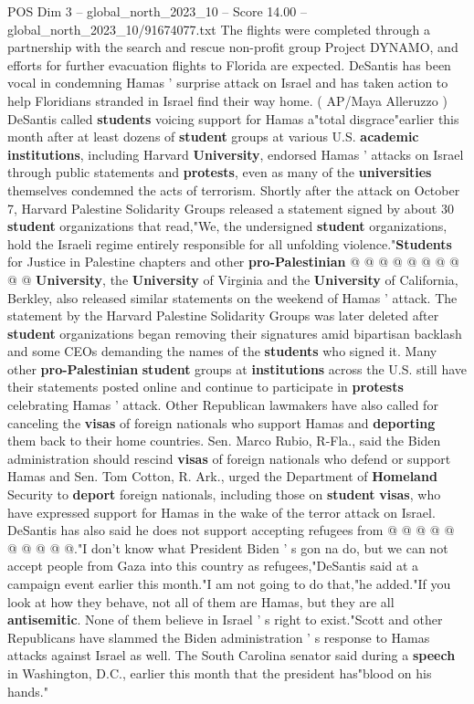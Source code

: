 \begin{textsample}{POS Dim 3 – global\_north\_2023\_10 – Score 14.00 – global\_north\_2023\_10/91674077.txt}
The flights were completed through a partnership with the search and rescue non-profit group Project DYNAMO, and efforts for further evacuation flights to Florida are expected.
DeSantis has been vocal in condemning Hamas ' surprise attack on Israel and has taken action to help Floridians stranded in Israel find their way home. ( AP/Maya Alleruzzo ) DeSantis called \textbf{students} voicing support for Hamas a"total disgrace"earlier this month after at least dozens of \textbf{student} groups at various U.S. \textbf{academic} \textbf{institutions}, including Harvard \textbf{University}, endorsed Hamas ' attacks on Israel through public statements and \textbf{protests}, even as many of the \textbf{universities} themselves condemned the acts of terrorism.
Shortly after the attack on October 7, Harvard Palestine Solidarity Groups released a statement signed by about 30 \textbf{student} organizations that read,"We, the undersigned \textbf{student} organizations, hold the Israeli regime entirely responsible for all unfolding violence."\textbf{Students} for Justice in Palestine chapters and other \textbf{pro-Palestinian} @ @ @ @ @ @ @ @ @ @ \textbf{University}, the \textbf{University} of Virginia and the \textbf{University} of California, Berkley, also released similar statements on the weekend of Hamas ' attack.
The statement by the Harvard Palestine Solidarity Groups was later deleted after \textbf{student} organizations began removing their signatures amid bipartisan backlash and some CEOs demanding the names of the \textbf{students} who signed it.
Many other \textbf{pro-Palestinian} \textbf{student} groups at \textbf{institutions} across the U.S. still have their statements posted online and continue to participate in \textbf{protests} celebrating Hamas ' attack.
Other Republican lawmakers have also called for canceling the \textbf{visas} of foreign nationals who support Hamas and \textbf{deporting} them back to their home countries.
Sen.
Marco Rubio, R-Fla., said the Biden administration should rescind \textbf{visas} of foreign nationals who defend or support Hamas and Sen.
Tom Cotton, R.
Ark., urged the Department of \textbf{Homeland} Security to \textbf{deport} foreign nationals, including those on \textbf{student} \textbf{visas}, who have expressed support for Hamas in the wake of the terror attack on Israel.
DeSantis has also said he does not support accepting refugees from @ @ @ @ @ @ @ @ @ @."I don't know what President Biden ' s gon na do, but we can not accept people from Gaza into this country as refugees,"DeSantis said at a campaign event earlier this month."I am not going to do that,"he added."If you look at how they behave, not all of them are Hamas, but they are all \textbf{antisemitic}.
None of them believe in Israel ' s right to exist."Scott and other Republicans have slammed the Biden administration ' s response to Hamas attacks against Israel as well.
The South Carolina senator said during a \textbf{speech} in Washington, D.C., earlier this month that the president has"blood on his hands."

\end{textsample}
